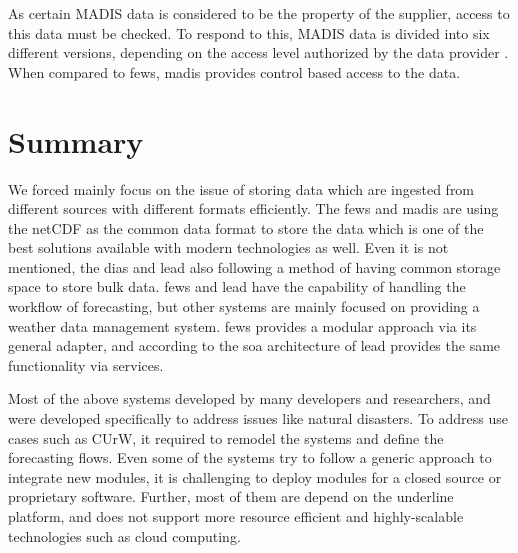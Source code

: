 As certain MADIS data is considered to be the property of the supplier, access to this data must be checked. To respond to this, MADIS data is divided into six different versions, depending on the access level authorized by the data provider \cite{Macdermaid2005ARCHITECTUREP2.39}. When compared to \acrshort{fews}, \acrshort{madis} provides control based access to the data.



\section{Summary}
\label{se:lit_summary}
 We forced mainly focus on the issue of storing data which are ingested from different sources with different formats efficiently. The \acrshort{fews} and \acrshort{madis} are using the \acrshort{netCDF} as the common data format to store the data which is one of the best solutions available with modern technologies as well. Even it is not mentioned, the \acrshort{dias} and \acrshort{lead} also following a method of having common storage space to store bulk data.
\acrshort{fews} and \acrshort{lead} have the capability of handling the workflow of forecasting, but other systems are mainly focused on providing a weather data management system.
\acrshort{fews} provides a modular approach via its general adapter, and according to the \acrshort{soa} architecture of \acrshort{lead} provides the same functionality via services.

Most of the above systems developed by many developers and researchers, and were developed specifically to address issues like natural disasters. To address use cases such as CUrW, it required to remodel the systems  and define the forecasting flows. Even some of the systems try to follow a generic approach to integrate new modules, it is challenging to deploy modules for a closed source or proprietary software. Further, most of them are depend on the underline platform, and does not support more resource efficient and highly-scalable technologies such as cloud computing.

